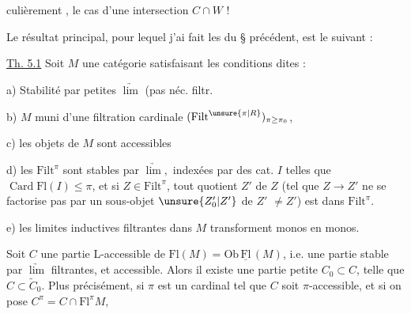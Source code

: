 %
%
culièrement , le cas d'une intersection $C\cap W$ !

Le résultat principal, pour lequel j'ai fait les  du § précédent, est le suivant :

\uline{Th. 5.1} Soit $M$ une catégorie satisfaisant les conditions dites :

 a) Stabilité par petites $\underrightarrow{\lim}$ (pas néc. filtr.

b) $M$ muni d'une filtration cardinale $(\mathrm{Filt}^{\unsure{\pi|R}})_{\pi\geq\pi_0}$,

c) les objets de $M$ sont accessibles

d) les $\mathrm{Filt}^\pi$ sont stables par $\underrightarrow{\lim}\!,$ indexées par des cat. $I$ telles que $\operatorname{Card}\mathrm{Fl}(I)\leq\pi$, et si $Z\in\mathrm{Filt}^\pi$, tout quotient $Z'$ de $Z$ (tel que $Z\longrightarrow Z'$ ne se factorise pas par un sous-objet $\unsure{Z'_0|Z'}$ de $Z'$ $\ne Z'$) est dans $\mathrm{Filt}^\pi$.

e) les limites inductives filtrantes dans $M$ transforment monos en monos.

\margin{$\big|$} Soit  $C$ une partie L-accessible de $\mathrm{Fl}(M)=\mathrm{Ob}\,\underline{\mathrm{Fl}}\,(M)$, i.e.  une partie stable par $\underrightarrow{\lim}$ filtrantes, et accessible.  
 Alors  il existe une partie petite $C_0\subset C$, telle que $C\subset\widetilde C_0$. Plus précisément, si $\pi$ est un  cardinal tel que $C$ soit $\pi$-accessible, et si on pose $C^\pi=C\cap\mathrm{Fl}^\pi M$,  
